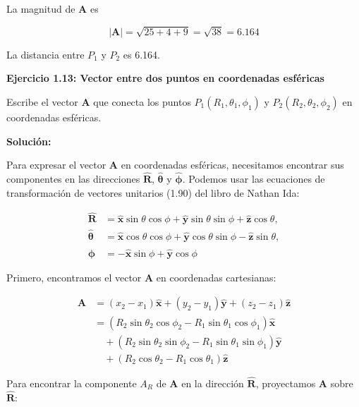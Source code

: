 \documentclass{book}
\begin{document}
La magnitud de $\mathbf{A}$ es

\begin{equation*}
|\mathbf{A}| = \sqrt{25 + 4 + 9} = \sqrt{38} = 6.164
\end{equation*}

La distancia entre $P_1$ y $P_2$ es 6.164.


\textbf{Ejercicio 1.13: Vector entre dos puntos en coordenadas esféricas}

Escribe el vector $\mathbf{A}$ que conecta los puntos $P_1(R_1, \theta_1, \phi_1)$ y $P_2(R_2, \theta_2, \phi_2)$ en coordenadas esféricas.

\textbf{Solución:}

Para expresar el vector $\mathbf{A}$ en coordenadas esféricas, necesitamos encontrar sus componentes en las direcciones $\mathbf{\hat{R}}$, $\mathbf{\hat{\theta}}$ y $\mathbf{\hat{\phi}}$.  Podemos usar las ecuaciones de transformación de vectores unitarios (1.90) del libro de Nathan Ida:

\begin{align*}
\mathbf{\hat{R}} &= \mathbf{\hat{x}} \sin \theta \cos \phi + \mathbf{\hat{y}} \sin \theta \sin \phi + \mathbf{\hat{z}} \cos \theta, \\
\mathbf{\hat{\theta}} &= \mathbf{\hat{x}} \cos \theta \cos \phi + \mathbf{\hat{y}} \cos \theta \sin \phi - \mathbf{\hat{z}} \sin \theta, \\
\mathbf{\hat{\phi}} &= -\mathbf{\hat{x}} \sin \phi + \mathbf{\hat{y}} \cos \phi
\end{align*}

Primero, encontramos el vector $\mathbf{A}$ en coordenadas cartesianas:

\begin{align*}
\mathbf{A} &= (x_2 - x_1) \mathbf{\hat{x}} + (y_2 - y_1) \mathbf{\hat{y}} + (z_2 - z_1) \mathbf{\hat{z}} \\
&= (R_2 \sin \theta_2 \cos \phi_2 - R_1 \sin \theta_1 \cos \phi_1) \mathbf{\hat{x}} \\
&\quad + (R_2 \sin \theta_2 \sin \phi_2 - R_1 \sin \theta_1 \sin \phi_1) \mathbf{\hat{y}} \\
&\quad + (R_2 \cos \theta_2 - R_1 \cos \theta_1) \mathbf{\hat{z}}
\end{align*}

Para encontrar la componente $A_R$ de $\mathbf{A}$ en la dirección $\mathbf{\hat{R}}$, proyectamos $\mathbf{A}$ sobre $\mathbf{\hat{R}}$:
\end{document}
